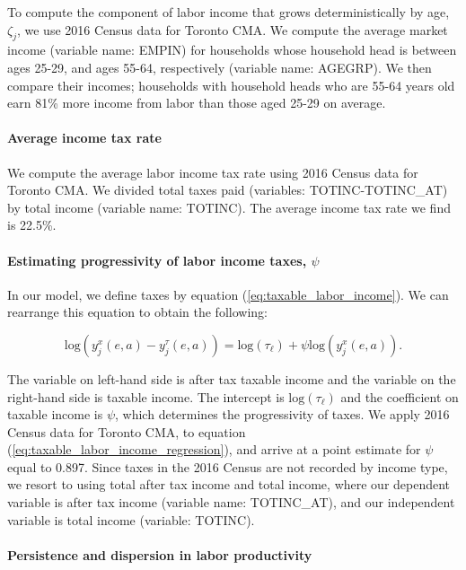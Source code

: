 \documentclass[parskip=full]{article}
\begin{document}
To compute the component of labor income that grows deterministically by age, $\zeta_{j}$, we use 2016 Census data for Toronto CMA. We compute the average market income (variable name: EMPIN) for households whose household head is between ages 25-29, and ages 55-64, respectively (variable name: AGEGRP). We then compare their incomes; households with household heads who are 55-64 years old earn 81\% more income from labor than those aged 25-29 on average.

\paragraph{Average income tax rate}

We compute the average labor income tax rate using 2016 Census data for Toronto CMA. We divided total taxes paid (variables: TOTINC-TOTINC\_AT) by total income (variable name: TOTINC). The average income tax rate we find is 22.5\%.

\paragraph{Estimating progressivity of labor income taxes, $\psi$}

In our model, we define taxes by equation (\ref{eq:taxable_labor_income}). We can rearrange this equation to obtain the following:

\begin{equation}\label{eq:taxable_labor_income_regression}
  \mbox{log}(y^{x}_{j}(e,a)-y^{\tau}_{j}(e,a))=\mbox{log}(\tau_{\ell})+\psi \mbox{log}(y^{x}_{j}(e,a)).
\end{equation}

\noindent The variable on left-hand side is after tax taxable income and the variable on the right-hand side is taxable income. The intercept is $\mbox{log}(\tau_{\ell})$ and the coefficient on taxable income is $\psi$, which determines the progressivity of taxes. We apply 2016 Census data for Toronto CMA, to equation (\ref{eq:taxable_labor_income_regression}), and arrive at a point estimate for $\psi$ equal to 0.897. Since taxes in the 2016 Census are not recorded by income type, we resort to using total after tax income and total income, where our dependent variable is after tax income (variable name: TOTINC\_AT), and our independent variable is total income (variable: TOTINC).

\paragraph{Persistence and dispersion in labor productivity}
\end{document}
